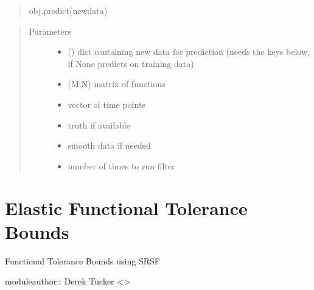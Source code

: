 \documentclass[letterpaper,10pt,english]{sphinxmanual}
\begin{document}
\begin{fulllineitems}
\begin{fulllineitems}
\begin{quote}
obj.predict(newdata)
\end{quote}
\begin{quote}\begin{description}
\item[{Parameters}] \leavevmode\begin{itemize}
\item {} 
 () \textendash{} dict containing new data for prediction (needs the keys below, if None predicts on training data)

\item {} 
 \textendash{} (M,N) matrix of functions

\item {} 
 \textendash{} vector of time points

\item {} 
 \textendash{} truth if available

\item {} 
 \textendash{} smooth data if needed

\item {} 
 \textendash{} number of times to run filter

\end{itemize}

\end{description}\end{quote}

\end{fulllineitems}


\end{fulllineitems}



\chapter{Elastic Functional Tolerance Bounds}
\label{\detokenize{tolerance:module-tolerance}}\label{\detokenize{tolerance:elastic-functional-tolerance-bounds}}\label{\detokenize{tolerance::doc}}
Functional Tolerance Bounds using SRSF

moduleauthor:: Derek Tucker \textless{}\textgreater{}
\end{document}

